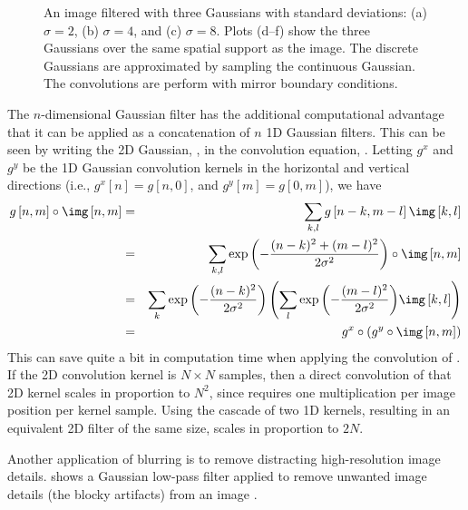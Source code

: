 \begin{figure}[t]
{%
}
\caption{An image filtered with three Gaussians with standard deviations: (a) $\sigma=2$, (b) $\sigma=4$, and (c) $\sigma=8$. Plots (d--f) show the three Gaussians over the same spatial support as the image. The discrete Gaussians are approximated by sampling the continuous Gaussian. The convolutions are perform with mirror boundary conditions. } 
\label{fig:zebragaussian}
\end{figure}





The $n$-dimensional Gaussian filter has the additional computational advantage that it can
be applied as a concatenation of $n$ 1D Gaussian filters.  This can be
seen by writing the 2D Gaussian, \eqn{\ref{eq:gauss2d}}, in the
convolution equation, \eqn{\ref{eq:2dconv}}.  Letting $g^x$
and $g^y$ be the 1D Gaussian convolution kernels in the horizontal
and vertical directions (i.e., $g^x [n]=g[n,0]$, and $g^y[m]=g[0,m]$), we have
\begin{eqnarray*}
g \left[n,m \right] \circ \img \left[n,m\right] 
& = & \sum_{k,l}
g \left[n-k,m-l \right] \img \left[k,l \right] \\
& = & \sum_{k,l}
\exp{ \left( -\frac{(n-k)^2 + (m-l)^2}{2 \sigma^2} \right) }
\circ \img \left[n,m \right] \\
& = & 
\sum_{k}
\exp{ \left( -\frac{(n-k)^2}{2 \sigma^2} \right) }
\left(
\sum_{l}
 \exp{ \left( -\frac{(m-l)^2}{2 \sigma^2} \right) } \img \left[k,l \right] 
 \right)
 \\
& = &
g^x \circ (g^y \circ \img \left[n,m \right])
\label{eq:2dgauss}
\end{eqnarray*}
This can save quite a bit in computation time when applying the
convolution of \eqn{\ref{eq:2dgauss}}.  If the 2D convolution kernel
is $N \times N$ samples, then a direct convolution of that 2D kernel scales
in proportion to $N^2$, since \eqn{\ref{eq:2dgauss}} requires one
multiplication per image position per kernel sample.  Using the
cascade of two 1D kernels, resulting in an equivalent 2D filter of
the same size, scales in proportion to $2N$.

Another application of blurring is to remove distracting
high-resolution image details.  
\fig{\ref{fig:lincoln}} shows a Gaussian low-pass filter applied to
remove unwanted image details (the blocky artifacts) from an image \cite{Harmon_1973}.

